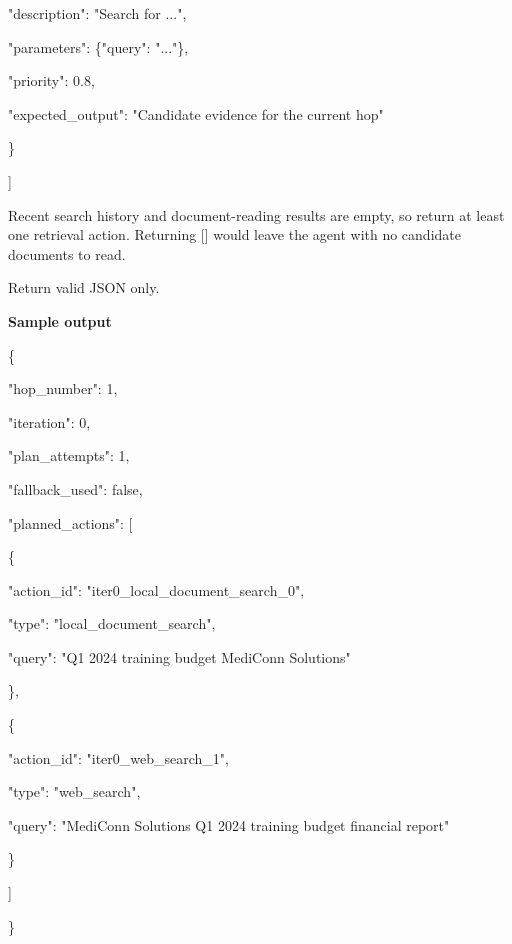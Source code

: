 \begin{tcolorbox}
\begin{scriptsize}
    "description": "Search for ...",\par
    "parameters": \{"query": "..."\},\par
    "priority": 0.8,\par
    "expected\_output": "Candidate evidence for the current hop"\par
  \}\par
]\par
\mbox{}\par
Recent search history and document-reading results are empty, so return at least one retrieval action. Returning [] would leave the agent with no candidate documents to read.\par
Return valid JSON only.\par
\medskip
\normalfont\textbf{Sample output}\par
\ttfamily
\{\par
  "hop\_number": 1,\par
  "iteration": 0,\par
  "plan\_attempts": 1,\par
  "fallback\_used": false,\par
  "planned\_actions": [\par
    \{\par
      "action\_id": "iter0\_local\_document\_search\_0",\par
      "type": "local\_document\_search",\par
      "query": "Q1 2024 training budget MediConn Solutions"\par
    \},\par
    \{\par
      "action\_id": "iter0\_web\_search\_1",\par
      "type": "web\_search",\par
      "query": "MediConn Solutions Q1 2024 training budget financial report"\par
    \}\par
  ]\par
\}\par
\end{scriptsize}
\end{tcolorbox}


